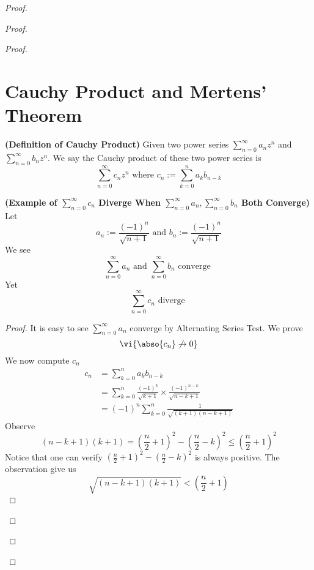\documentclass{report}
\begin{document}
\begin{proof}
\begin{proof}
\begin{proof}
\section{Cauchy Product and Mertens' Theorem}
\begin{definition}
\label{4.7.1}
\textbf{(Definition of Cauchy Product)} Given two power series $\sum_{n=0}^\infty a_nz^n$ and $\sum_{n=0}^\infty b_nz^n$. We say the Cauchy product of these two power series is 
\begin{equation*}
\sum_{n=0}^\infty c_nz^n\text{ where $c_n:=\sum_{k=0}^n a_kb_{n-k}$}
\end{equation*}
\end{definition}
\begin{theorem}
\label{4.7.2}
\textbf{(Example of $\sum_{n=0}^\infty c_n$ Diverge When  $\sum_{n=0}^\infty a_n,\sum_{n=0}^\infty b_n$ Both Converge)} Let 
\begin{equation*}
a_n:=\frac{(-1)^n}{\sqrt{n+1} }\text{ and }b_n:=\frac{(-1)^n}{\sqrt{n+1} }
\end{equation*}
We see 
\begin{equation*}
\sum_{n=0}^\infty a_n\text{ and }\sum_{n=0}^\infty b_n\text{ converge }
\end{equation*}
Yet 
\begin{equation*}
\sum_{n=0}^\infty c_n\text{ diverge }
\end{equation*}
\end{theorem}
\begin{proof}
It is easy to see $\sum_{n=0}^\infty a_n$ converge by Alternating Series Test. We prove 
\begin{equation*}
\vi{\abso{c_n}\not\to 0}
\end{equation*}
We now compute $c_n$ 
\begin{align*}
c_n&=\sum_{k=0}^n a_kb_{n-k}\\
&=\sum_{k=0}^n \frac{(-1)^k}{\sqrt{k+1} } \times \frac{(-1)^{n-k}}{\sqrt{ n-k+1} }\\
&=(-1)^n \sum_{k=0}^n \frac{1}{\sqrt{(k+1)(n-k+1)} }
\end{align*}
Observe
\begin{equation*}
  (n-k+1)(k+1)=(\frac{n}{2}+1)^2-(\frac{n}{2}-k)^2\leq (\frac{n}{2}+1)^2
\end{equation*}
Notice that one can verify $(\frac{n}{2}+1)^2-(\frac{n}{2}-k)^2$ is always positive. The observation give us 
\begin{equation*}
\sqrt{(n-k+1)(k+1)} < (\frac{n}{2}+1)
\end{equation*}

\end{proof}
\end{proof}
\end{proof}
\end{proof}
\end{document}
